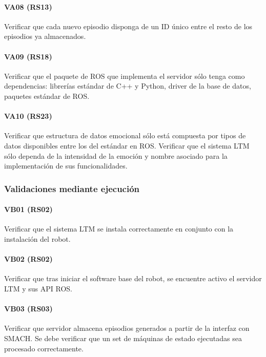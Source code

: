 \paragraph{VA08 (RS13)}
Verificar que cada nuevo episodio disponga de un ID único entre el resto de los episodios ya almacenados.

\paragraph{VA09 (RS18)}
Verificar que el paquete de ROS que implementa el servidor sólo tenga como dependencias: librerías estándar de C++ y Python, driver de la base de datos, paquetes estándar de ROS.


\paragraph{VA10 (RS23)}
Verificar que estructura de datos emocional sólo está compuesta por tipos de datos disponibles entre los del estándar en ROS. Verificar que el sistema LTM sólo dependa de la intensidad de la emoción y nombre asociado para la implementación de sus funcionalidades.


\subsubsection{Validaciones mediante ejecución}

\paragraph{VB01 (RS02)}
Verificar que el sistema LTM se instala correctamente en conjunto con la instalación del robot.

\paragraph{VB02 (RS02)}
Verificar que tras iniciar el software base del robot, se encuentre activo el servidor LTM y sus API ROS.

\paragraph{VB03 (RS03)}
Verificar que servidor almacena episodios generados a partir de la interfaz con SMACH. Se debe verificar que un set de máquinas de estado ejecutadas sea procesado correctamente.

